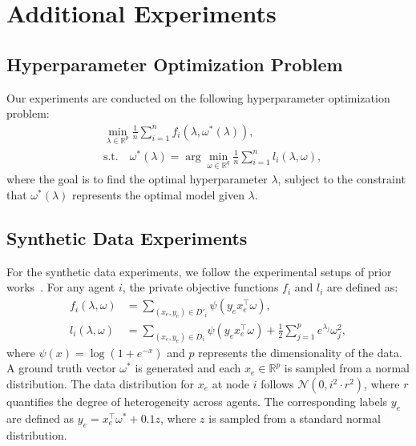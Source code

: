 \documentclass{article}
\theoremstyle{plain}
\theoremstyle{definition}
\theoremstyle{remark}
\begin{document}
\section{Additional Experiments}\label{experimentsec}
\subsection{Hyperparameter Optimization Problem}\label{hypersec}
Our experiments are conducted on the following hyperparameter optimization problem:
\begin{equation*}
\begin{aligned}
&\!\!\min_{\lambda \in \mathbb{R}^p} \frac{1}{n} \sum_{i=1}^n f_i(\lambda, \omega^*(\lambda)), \\
&\text{s.t.}\quad \omega^*(\lambda) = \arg \min_{\omega \in \mathbb{R}^q} \frac{1}{n} \sum_{i=1}^n l_i(\lambda, \omega),
\end{aligned}
\end{equation*}
where the goal is to find the optimal hyperparameter \(\lambda\), subject to the constraint that \(\omega^*(\lambda)\) represents the optimal model given \(\lambda\).

\subsection{Synthetic Data Experiments}\label{synthesec}
For the synthetic data experiments, we follow the experimental setups of prior works~\citep{pedregosa2016hyperparameter, grazzi2020iteration, chen2024decentralized}. For any agent $i$, the private objective functions \(f_i\) and \(l_i\) are defined as:
\begin{equation*}
\begin{aligned}
    f_i(\lambda, \omega) &= \sum_{(x_e, y_e) \in D'_i} \psi(y_e x_e^\top \omega),\\
    l_i(\lambda, \omega) &= \sum_{(x_e, y_e) \in D_i} \psi(y_e x_e^\top \omega) + \frac{1}{2} \sum_{j=1}^p e^{\lambda_j} \omega_j^2,
\end{aligned}
\end{equation*}
where \(\psi(x) = \log(1+e^{-x})\) and \(p\) represents the dimensionality of the data. A ground truth vector \(\omega^*\) is generated and each \(x_e \in \mathbb{R}^p\) is sampled from a normal distribution. The data distribution for \(x_e\) at node \(i\) follows \(\mathcal{N}(0, i^2\cdot r^2)\), where $r$ quantifies the degree of heterogeneity across agents. The corresponding labels \(y_e\) are defined as \(y_e = x_e^\top \omega^* + 0.1 z\), where \(z\) is sampled from a standard normal distribution.
\end{document}
